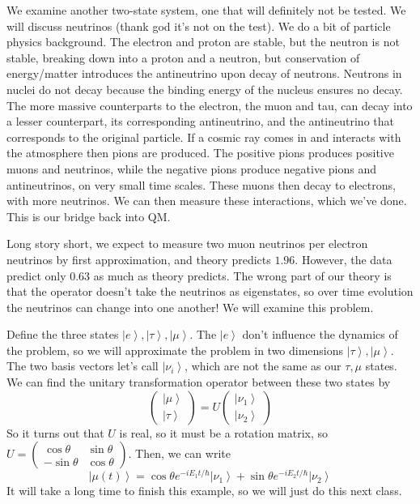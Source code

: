 \documentclass[10pt]{report}
\newcommand{\ket}[1]{\left|#1\right>}
\begin{document}
We examine another two-state system, one that will definitely not be tested. We will discuss neutrinos (thank god it's not on the test). We do a bit of particle physics background. The electron and proton are stable, but the neutron is not stable, breaking down into a proton and a neutron, but conservation of energy/matter introduces the antineutrino upon decay of neutrons. Neutrons in nuclei do not decay because the binding energy of the nucleus ensures no decay. The more massive counterparts to the electron, the muon and tau, can decay into a lesser counterpart, its corresponding antineutrino, and the antineutrino that corresponds to the original particle. If a cosmic ray comes in and interacts with the atmosphere then pions are produced. The positive pions produces positive muons and neutrinos, while the negative pions produce negative pions and antineutrinos, on very small time scales. These muons then decay to electrons, with more neutrinos. We can then measure these interactions, which we've done. This is our bridge back into QM.

Long story short, we expect to measure two muon neutrinos per electron neutrinos by first approximation, and theory predicts $1.96$. However, the data predict only $0.63$ as much as theory predicts. The wrong part of our theory is that the operator doesn't take the neutrinos as eigenstates, so over time evolution the neutrinos can change into one another! We will examine this problem.

Define the three states $\ket{e},\ket{\tau}, \ket{\mu}$. The $\ket{e}$ don't influence the dynamics of the problem, so we will approximate the problem in two dimensions $\ket{\tau},\ket{\mu}$. The two basis vectors let's call $\ket{\nu_i}$, which are not the same as our $\tau,\mu$ states. We can find the unitary transformation operator between these two states by
$$\begin{pmatrix}\ket{\mu}\\\ket{\tau}\end{pmatrix}=U\begin{pmatrix}\ket{\nu_1}\\\ket{\nu_2}\end{pmatrix}$$
So it turns out that $U$ is real, so it must be a rotation matrix, so $U=\begin{pmatrix}\cos\theta&\sin\theta\\-\sin\theta&\cos\theta\end{pmatrix}$. Then, we can write
$$\ket{\mu(t)} = \cos\theta e^{-iE_1t/\hbar}\ket{\nu_1} + \sin\theta e^{-iE_2t/\hbar}\ket{\nu_2}$$
It will take a long time to finish this example, so we will just do this next class.
\end{document}

